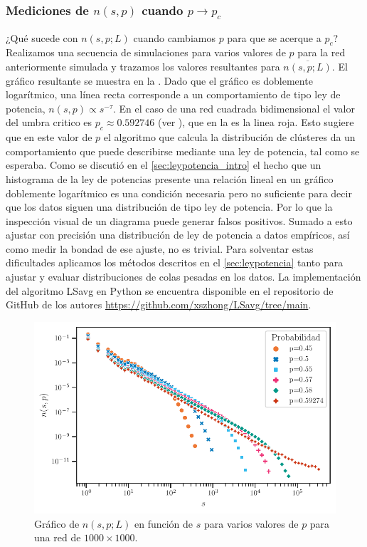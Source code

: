 \subsubsection{Mediciones de $n(s, p)$ cuando $p \to p_c$}\label{sec_critico}

¿Qué sucede con $n(s, p;L)$ cuando cambiamos $p$ para que se acerque a $p_c$? Realizamos una secuencia de simulaciones para varios valores de $p$ para la red anteriormente simulada y trazamos los valores resultantes para $\overline{n(s, p; L)}$. El gráfico resultante se muestra en la . Dado que el gráfico es doblemente logarítmico, una línea recta corresponde a un comportamiento de tipo ley de potencia, $n(s, p) \propto s^{-\tau}$.  En el caso de una red cuadrada bidimensional el valor del umbra critico es $p_c\approx0.592746$ (ver ), que en la   es la linea roja. Esto  sugiere que en este valor de $p$ el algoritmo que calcula la distribución de clústeres da un comportamiento que puede describirse mediante una ley de potencia, tal como se esperaba. Como se discutió en  el \cref{sec:leypotencia_intro}   el  hecho que un histograma de la ley de potencias presente una relación lineal en un gráfico doblemente logarítmico es una condición necesaria pero no suficiente para decir que los datos siguen una distribución de tipo ley de potencia. Por lo que la inspección visual de un diagrama puede generar falsos positivos.  Sumado a esto  ajustar con precisión una distribución de ley de potencia a datos empíricos, así como medir la bondad de ese ajuste, no es trivial. Para solventar estas dificultades aplicamos los métodos descritos en el \cref{sec:leypotencia} tanto para ajustar y evaluar distribuciones de colas pesadas en los datos. La implementación del algoritmo LSavg en Python se encuentra disponible en el repositorio de GitHub  de los autores \url{https://github.com/xszhong/LSavg/tree/main}.  


\begin{figure}[h!]
	\centering{}\includegraphics[width=\imsize]{num_cluster_critico.pdf}
	\caption[Gráfico de $n(s, p; L)$ en función de $s$ para varios valores de $p$ para una red de $1000\times1000$.]{Gráfico de $n(s, p; L)$ en función de $s$ para varios valores de $p$ para una red de $1000\times1000$.}\label{f:num_cluster_critico}  
\end{figure}



